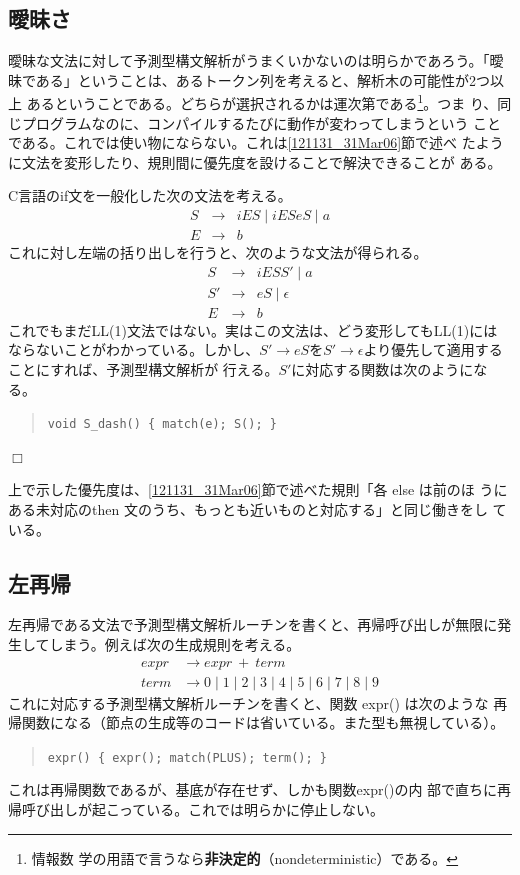 \subsection{曖昧さ}

曖昧な文法に対して予測型構文解析がうまくいかないのは明らかであろう。「曖
昧である」ということは、あるトークン列を考えると、解析木の可能性が2つ以上
あるということである。どちらが選択されるかは運次第である\footnote{情報数
学の用語で言うなら{\bfseries 非決定的}（nondeterministic）である。}。つま
り、同じプログラムなのに、コンパイルするたびに動作が変わってしまうという
ことである。これでは使い物にならない。これは\ref{121131_31Mar06}節で述べ
たように文法を変形したり、規則間に優先度を設けることで解決できることが
ある。

\begin{example}
 C言語のif文を一般化した次の文法を考える。
 \begin{eqnarray*}
  S & \rightarrow & iES \mid iESeS \mid a \\
  E & \rightarrow & b
 \end{eqnarray*}
 これに対し左端の括り出しを行うと、次のような文法が得られる。
 \begin{eqnarray*}
  S & \rightarrow & iESS' \mid a \\
  S' & \rightarrow & eS \mid \epsilon \\
  E & \rightarrow & b
 \end{eqnarray*}
 これでもまだLL(1)文法ではない。実はこの文法は、どう変形してもLL(1)には
 ならないことがわかっている。しかし、$S' \rightarrow eS$を$S'
 \rightarrow \epsilon$より優先して適用することにすれば、予測型構文解析が
 行える。$S'$に対応する関数は次のようになる。
 \begin{quote}
  \verb|void S_dash() { match(e); S(); }|
 \end{quote}$\Box$
\end{example}
上で示した優先度は、\ref{121131_31Mar06}節で述べた規則「各 else は前のほ
うにある未対応のthen 文のうち、もっとも近いものと対応する」と同じ働きをし
ている。

\subsection{左再帰}

左再帰である文法で予測型構文解析ルーチンを書くと、再帰呼び出しが無限に発
生してしまう。例えば次の生成規則を考える。
\begin{align*}
 expr & \rightarrow expr\ +\ term \\
 term & \rightarrow 0 \mid 1 \mid 2 \mid 3 \mid 4 \mid 5 \mid 6 \mid 7
 \mid 8 \mid 9
\end{align*}
これに対応する予測型構文解析ルーチンを書くと、関数 expr() は次のような
再帰関数になる（節点の生成等のコードは省いている。また型も無視している）。
\begin{quote}
 \verb|expr() { expr(); match(PLUS); term(); }|
\end{quote}
これは再帰関数であるが、基底が存在せず、しかも関数{\sffamily expr()}の内
部で直ちに再帰呼び出しが起こっている。これでは明らかに停止しない。

